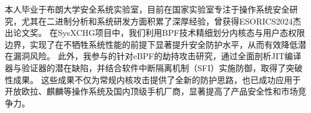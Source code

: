 
\begin{cvparagraph}
    本人毕业于布朗大学安全系统实验室，目前在国家实验室专注于操作系统安全研究，尤其在二进制分析和系统研发方面积累了深厚经验，曾获得ESORICS2024杰出论文奖。
    在SysXCHG项目中，我们利用BPF技术精细划分内核态与用户态权限边界，实现了在不牺牲系统性能的前提下显著提升安全防护水平，从而有效降低潜在漏洞风险。
    此外，我参与的针对eBPF的劫持攻击研究，通过全面剖析JIT编译器与验证器的潜在缺陷，并结合软件中断隔离机制（SFI）实施防御，取得了突破性成果。
    这些成果不仅为常规内核攻击提供了全新的防护思路，也已成功应用于开放欧拉、麒麟等操作系统及国内顶级手机厂商，显著提高了产品安全性和市场竞争力。
\end{cvparagraph}
